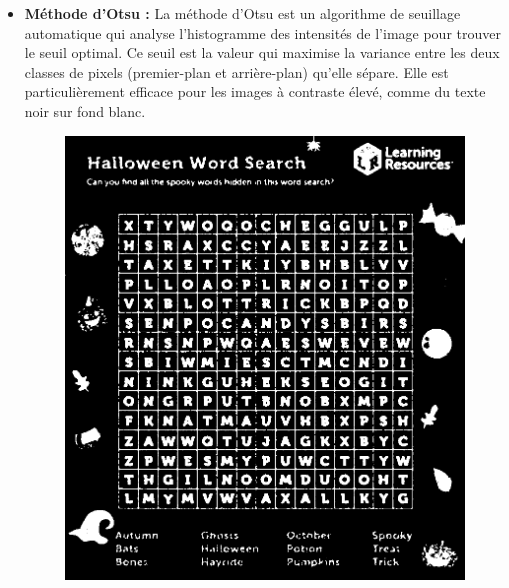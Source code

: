 \documentclass{article}
\begin{document}
  \begin{itemize}
    \item \textbf{Méthode d'Otsu \cite{otsu1979threshold} :} La méthode d'Otsu est un algorithme de seuillage automatique qui analyse l'histogramme des intensités de l'image pour trouver le seuil optimal. Ce seuil est la valeur qui maximise la variance entre les deux classes de pixels (premier-plan et arrière-plan) qu'elle sépare. Elle est particulièrement efficace pour les images à contraste élevé, comme du texte noir sur fond blanc.
    \begin{figure}[H]
      \centering
          \includegraphics[width=\linewidth]{ressources/image_2_word_detection_03_otsu_threshold.png}
          \caption{}
        \endminipage\quad\quad\quad\quad

\end{figure}
\end{itemize}
\end{document}
